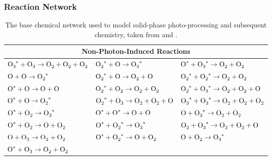 \documentclass[journal=aesccq,manuscript=article,layout=twocolumn]{achemso}
\begin{document}
\subsubsection{Reaction Network}

\begin{table}[htbp]
\centering
\footnotesize
\caption{The base chemical network used to model solid-phase  photo-processing and subsequent chemistry, taken from \citet{mullikin_new_2021} and \citet{shingledecker_simulating_2019}.}
\label{tab:onetwork}
\begin{tabular}{lll}
\toprule
\multicolumn{3}{c}{Non-Photon-Induced Reactions} \\
\midrule
$\ce{O3^*} + \ce{O3} \rightarrow \ce{O2} + \ce{O2} + \ce{O2}$ &
$\ce{O2^*} + \ce{O} \rightarrow \ce{O3^*}$ &
$\ce{O^*} + \ce{O3^*} \rightarrow \ce{O2} + \ce{O2}$ \\

$\ce{O} + \ce{O} \rightarrow \ce{O2^*}$ &
$\ce{O2^*} + \ce{O} \rightarrow \ce{O2} + \ce{O}$ &
$\ce{O2^*} + \ce{O2^*} \rightarrow \ce{O2} + \ce{O2}$ \\

$\ce{O^*} + \ce{O} \rightarrow \ce{O} + \ce{O}$ &
$\ce{O2^*} + \ce{O2} \rightarrow \ce{O2} + \ce{O2}$ &
$\ce{O2^*} + \ce{O3^*} \rightarrow \ce{O2} + \ce{O2} + \ce{O}$ \\

$\ce{O^*} + \ce{O} \rightarrow \ce{O2^*}$ &
$\ce{O2^*} + \ce{O3} \rightarrow \ce{O2} + \ce{O2} + \ce{O}$ &
$\ce{O3^*} + \ce{O3^*} \rightarrow \ce{O2} + \ce{O2} + \ce{O2}$ \\

$\ce{O^*} + \ce{O2} \rightarrow \ce{O3^*}$ &
$\ce{O^*} + \ce{O^*} \rightarrow \ce{O} + \ce{O}$ &
$\ce{O} + \ce{O3^*} \rightarrow \ce{O2} + \ce{O2}$ \\

$\ce{O^*} + \ce{O2} \rightarrow \ce{O} + \ce{O2}$ &
$\ce{O^*} + \ce{O2^*} \rightarrow \ce{O3^*}$ &
$\ce{O2} + \ce{O3^*} \rightarrow \ce{O2} + \ce{O2} + \ce{O}$ \\

$\ce{O} + \ce{O3} \rightarrow \ce{O2} + \ce{O2}$ &
$\ce{O^*} + \ce{O2^*} \rightarrow \ce{O} + \ce{O2}$ &
$\ce{O} + \ce{O2} \rightarrow \ce{O3^*}$ \\

$\ce{O^*} + \ce{O3} \rightarrow \ce{O2} + \ce{O2}$ & & \\
\bottomrule
\end{tabular}
\end{table}
\end{document}
